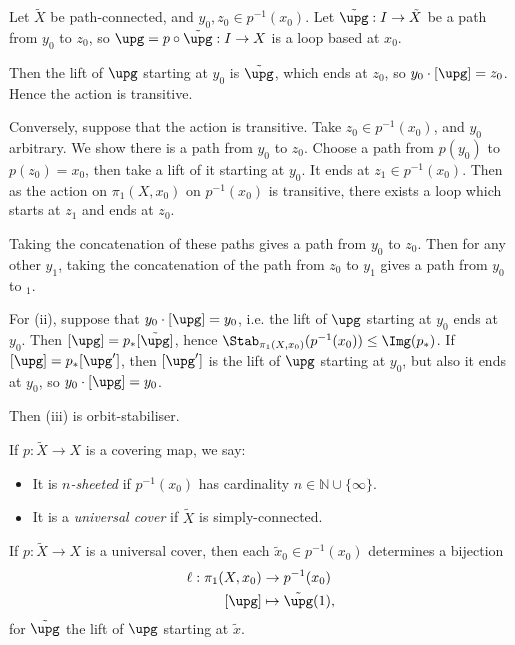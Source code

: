 \documentclass[12pt]{article}
\begin{document}
\begin{proofbox}
	Let $\tilde X$ be path-connected, and $y_0, z_0 \in p^{-1}(x_0)$. Let $\tilde \upg : I \to \tilde X$ be a path from $y_0$ to $z_0$, so $\upg = p \circ \tilde \upg : I \to X$ is a loop based at $x_0$.

	Then the lift of $\upg$ starting at $y_0$ is $\tilde \upg$, which ends at $z_0$, so $y_0 \cdot [\upg] = z_0$. Hence the action is transitive.

	Conversely, suppose that the action is transitive. Take $z_0 \in p^{-1}(x_0)$, and $y_0$ arbitrary. We show there is a path from $y_0$ to $z_0$. Choose a path from $p(y_0)$ to $p(z_0) = x_0$, then take a lift of it starting at $y_0$. It ends at $z_1 \in p^{-1}(x_0)$. Then as the action on $\pi_1(X, x_0)$ on $p^{-1}(x_0)$ is transitive, there exists a loop which starts at $z_1$ and ends at $z_0$.

	Taking the concatenation of these paths gives a path from $y_0$ to $z_0$. Then for any other $y_1$, taking the concatenation of the path from $z_0$ to $y_1$ gives a path from $y_0$ to $_1$.

	For (ii), suppose that $y_0 \cdot [\upg] = y_0$, i.e. the lift of $\upg$ starting at $y_0$ ends at $y_0$. Then $[\upg] = p_\ast[\tilde \upg]$, hence $\Stab_{\pi_1(X, x_0)}(p^{-1}(x_0)) \leq \Img(p_\ast)$. If $[\upg] = p_\ast[\upg']$, then $[\upg']$ is the lift of $\upg$ starting at $y_0$, but also it ends at $y_0$, so $y_0 \cdot[\upg] = y_0$.

	Then (iii) is orbit-stabiliser.
\end{proofbox}

\begin{definition}
	If $p : \tilde X \to X$ is a covering map, we say:
	\begin{itemize}
		\item It is $n$\emph{-sheeted} if $p^{-1}(x_0)$ has cardinality $n \in \mathbb{N} \cup \{\infty\}$.
		\item It is a \emph{universal cover} if $\tilde X$ is simply-connected.
	\end{itemize}
\end{definition}

\begin{corollary}
	If $p : \tilde X \to X$ is a universal cover, then each $\tilde x_0 \in p^{-1}(x_0)$ determines a bijection
	\begin{align*}
		\ell : \pi_1(X, x_0) &\to p^{-1}(x_0) \\
		[\upg] &\mapsto \tilde \upg(1),
	\end{align*}
	for $\tilde \upg$ the lift of $\upg$ starting at $\tilde x$.
\end{corollary}
\end{document}

